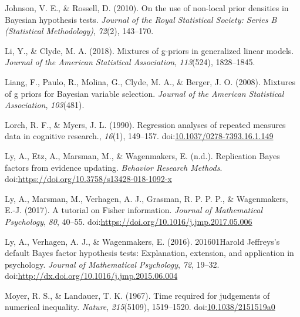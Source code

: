 \documentclass[english,,doc,floatsintext]{apa6}
\begin{document}
\leavevmode\hypertarget{ref-johnson2010use}{}%
Johnson, V. E., \& Rossell, D. (2010). On the use of non-local prior densities in Bayesian hypothesis tests. \emph{Journal of the Royal Statistical Society: Series B (Statistical Methodology)}, \emph{72}(2), 143--170.

\leavevmode\hypertarget{ref-li2018mixtures}{}%
Li, Y., \& Clyde, M. A. (2018). Mixtures of g-priors in generalized linear models. \emph{Journal of the American Statistical Association}, \emph{113}(524), 1828--1845.

\leavevmode\hypertarget{ref-liang2008mixtures}{}%
Liang, F., Paulo, R., Molina, G., Clyde, M. A., \& Berger, J. O. (2008). Mixtures of g priors for Bayesian variable selection. \emph{Journal of the American Statistical Association}, \emph{103}(481).

\leavevmode\hypertarget{ref-lorch1990}{}%
Lorch, R. F., \& Myers, J. L. (1990). Regression analyses of repeated measures data in cognitive research., \emph{16}(1), 149--157. doi:\href{https://doi.org/10.1037/0278-7393.16.1.149}{10.1037/0278-7393.16.1.149}

\leavevmode\hypertarget{ref-ly2017replication}{}%
Ly, A., Etz, A., Marsman, M., \& Wagenmakers, E. (n.d.). Replication Bayes factors from evidence updating. \emph{Behavior Research Methods}. doi:\href{https://doi.org/https://doi.org/10.3758/s13428-018-1092-x}{https://doi.org/10.3758/s13428-018-1092-x}

\leavevmode\hypertarget{ref-ly2017tutorial}{}%
Ly, A., Marsman, M., Verhagen, A. J., Grasman, R. P. P. P., \& Wagenmakers, E.-J. (2017). A tutorial on Fisher information. \emph{Journal of Mathematical Psychology}, \emph{80}, 40--55. doi:\href{https://doi.org/https://doi.org/10.1016/j.jmp.2017.05.006}{https://doi.org/10.1016/j.jmp.2017.05.006}

\leavevmode\hypertarget{ref-ly2016harold}{}%
Ly, A., Verhagen, A. J., \& Wagenmakers, E. (2016). 201601Harold Jeffreys's default Bayes factor hypothesis tests: Explanation, extension, and application in psychology. \emph{Journal of Mathematical Psychology}, \emph{72}, 19--32. doi:\href{https://doi.org/http://dx.doi.org/10.1016/j.jmp.2015.06.004}{http://dx.doi.org/10.1016/j.jmp.2015.06.004}

\leavevmode\hypertarget{ref-moyer1967}{}%
Moyer, R. S., \& Landauer, T. K. (1967). Time required for judgements of numerical inequality. \emph{Nature}, \emph{215}(5109), 1519--1520. doi:\href{https://doi.org/10.1038/2151519a0}{10.1038/2151519a0}
\end{document}
